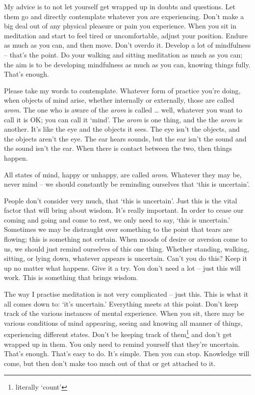 My advice is to not let yourself get wrapped up in doubts and questions. Let them go and directly contemplate whatever you are experiencing. Don't make a big deal out of any physical pleasure or pain you experience. When you sit in meditation and start to feel tired or uncomfortable, adjust your position. Endure as much as you can, and then move. Don't overdo it. Develop a lot of mindfulness -- that's the point. Do your walking and sitting meditation as much as you can; the aim is to be developing mindfulness as much as you can, knowing things fully. That's enough.

Please take my words to contemplate. Whatever form of practice you're doing, when objects of mind arise, whether internally or externally, those are called \textit{arom}. The one who is aware of the \textit{arom} is called \ldots{} well, whatever you want to call it is OK; you can call it `mind'. The \textit{arom} is one thing, and the  the \textit{arom} is another. It's like the eye and the objects it sees. The eye isn't the objects, and the objects aren't the eye. The ear hears sounds, but the ear isn't the sound and the sound isn't the ear. When there is contact between the two, then things happen.

All states of mind, happy or unhappy, are called \textit{arom}. Whatever they may be, never mind -- we should constantly be reminding ourselves that `this is uncertain'.

People don't consider very much, that `this is uncertain'. Just this is the vital factor that will bring about wisdom. It's really important. In order to cease our coming and going and come to rest, we only need to say, `this is uncertain.' Sometimes we may be distraught over something to the point that tears are flowing; this is something not certain. When moods of desire or aversion come to us, we should just remind ourselves of this one thing. Whether standing, walking, sitting, or lying down, whatever appears is uncertain. Can't you do this? Keep it up no matter what happens. Give it a try. You don't need a lot -- just this will work. This is something that brings wisdom.

The way I practise meditation is not very complicated -- just this. This is what it all comes down to: `it's uncertain.' Everything meets at this point. Don't keep track of the various instances of mental experience. When you sit, there may be various conditions of mind appearing, seeing and knowing all manner of things, experiencing different states. Don't be keeping track of them\footnote{literally `count'} and don't get wrapped up in them. You only need to remind yourself that they're uncertain. That's enough. That's easy to do. It's simple. Then you can stop. Knowledge will come, but then don't make too much out of that or get attached to it.

